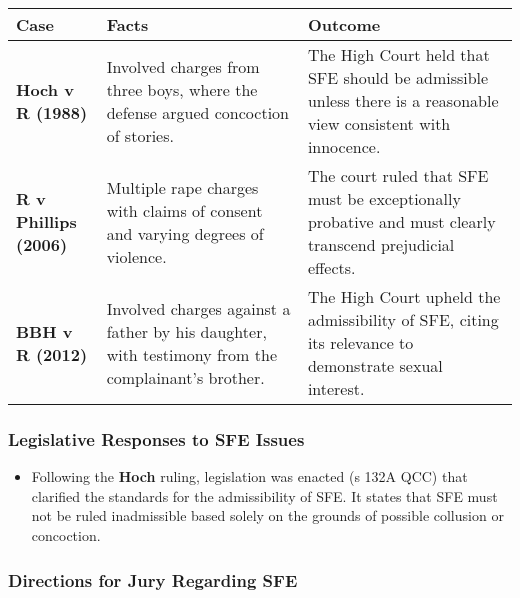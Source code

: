 \begin{longtable}[]{@{}
  >{\raggedright\arraybackslash}p{}
  >{\raggedright\arraybackslash}p{}
  >{\raggedright\arraybackslash}p{}@{}}
\toprule\noalign{}
\begin{minipage}[b]{\linewidth}\raggedright
Case
\end{minipage} & \begin{minipage}[b]{\linewidth}\raggedright
Facts
\end{minipage} & \begin{minipage}[b]{\linewidth}\raggedright
Outcome
\end{minipage} \\
\midrule\noalign{}
\endhead
\bottomrule\noalign{}
\endlastfoot
\textbf{Hoch v R (1988)} & Involved charges from three boys, where the
defense argued concoction of stories. & The High Court held that SFE
should be admissible unless there is a reasonable view consistent with
innocence. \\
\textbf{R v Phillips (2006)} & Multiple rape charges with claims of
consent and varying degrees of violence. & The court ruled that SFE must
be exceptionally probative and must clearly transcend prejudicial
effects. \\
\textbf{BBH v R (2012)} & Involved charges against a father by his
daughter, with testimony from the complainant's brother. & The High
Court upheld the admissibility of SFE, citing its relevance to
demonstrate sexual interest. \\
\end{longtable}

\subsubsection{Legislative Responses to SFE
Issues}\label{legislative-responses-to-sfe-issues}

\begin{itemize}
\tightlist
\item
  Following the \textbf{Hoch} ruling, legislation was enacted (s 132A
  QCC) that clarified the standards for the admissibility of SFE. It
  states that SFE must not be ruled inadmissible based solely on the
  grounds of possible collusion or concoction.
\end{itemize}

\subsubsection{Directions for Jury Regarding
SFE}\label{directions-for-jury-regarding-sfe}

